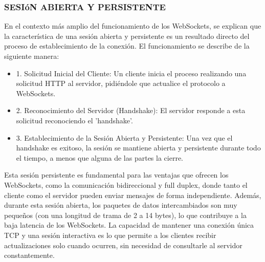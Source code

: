 \documentclass{report}
\begin{document}
\subsubsection{SESIóN ABIERTA Y PERSISTENTE}
En el contexto más amplio del funcionamiento de los WebSockets, se  explican que la característica de una sesión abierta y 
persistente es un resultado directo del proceso de establecimiento de la conexión.
El funcionamiento se describe de la siguiente manera:
\begin{itemize}
    \item 1. Solicitud Inicial del Cliente: Un cliente inicia el proceso realizando una solicitud HTTP al servidor, pidiéndole que actualice 
    el protocolo a WebSockets.
    \item 2. Reconocimiento del Servidor (Handshake): El servidor responde a esta solicitud reconociendo el 'handshake'.
    \item 3. Establecimiento de la Sesión Abierta y Persistente: Una vez que el handshake es exitoso, la sesión se mantiene abierta y 
    persistente durante todo el tiempo, a menos que alguna de las partes la cierre.
\end{itemize}
Esta sesión persistente es fundamental para las ventajas que ofrecen los WebSockets, como la comunicación bidireccional y full duplex, 
donde tanto el cliente como el servidor pueden enviar mensajes de forma independiente. Además, durante esta sesión abierta, los paquetes 
de datos intercambiados son muy pequeños (con una longitud de trama de 2 a 14 bytes), lo que contribuye a la baja latencia de los WebSockets. 
La capacidad de mantener una conexión única TCP y una sesión interactiva es lo que permite a los clientes recibir actualizaciones solo cuando 
ocurren, sin necesidad de consultarle al servidor constantemente.
\end{document}
